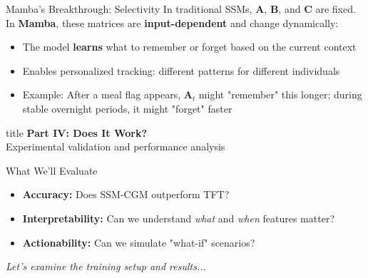 \documentclass[aspectratio=169,xcolor=dvipsnames]{beamer}
\begin{document}
\begin{frame}
    \vspace{1em}
    \begin{alertblock}{Mamba's Breakthrough: Selectivity}
        In traditional SSMs, $\mathbf{A}$, $\mathbf{B}$, and $\mathbf{C}$ are fixed. In \textbf{Mamba}, these matrices are \textbf{input-dependent} and change dynamically:
        \begin{itemize}
            \item The model \textbf{learns} what to remember or forget based on the current context
            \item Enables personalized tracking: different patterns for different individuals
            \item Example: After a meal flag appears, $\mathbf{A}_t$ might "remember" this longer; during stable overnight periods, it might "forget" faster
        \end{itemize}
    \end{alertblock}
\end{frame}

\begin{frame}[plain]
    \centering
    \vfill
    \begin{beamercolorbox}[center,shadow=true,rounded=true]{title}
        \textbf{Part IV: Does It Work?}\\
        \vspace{0.5em}
        \large Experimental validation and performance analysis
    \end{beamercolorbox}
    \vfill
    
    \vspace{1em}
    \normalsize
    \begin{block}{What We'll Evaluate}
        \begin{itemize}
            \item \textbf{Accuracy:} Does SSM-CGM outperform TFT?
            \item \textbf{Interpretability:} Can we understand \textit{what} and \textit{when} features matter?
            \item \textbf{Actionability:} Can we simulate "what-if" scenarios?
        \end{itemize}
    \end{block}
    
    \vspace{1em}
    \textit{Let's examine the training setup and results...}
\end{frame}
\end{document}
